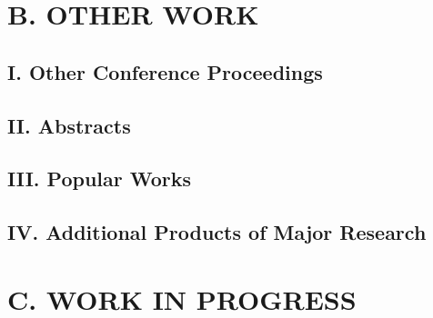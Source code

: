 \documentclass{res}
\newcommand{\MarginText}[1]{\section{#1}\vspace{10pt}}
\begin{document}
\begin{resume}
  \MarginText{B. OTHER WORK}
  \subsection{I. Other Conference Proceedings}
  \nocite{*}
  \vspace{10pt}
  \printbibliography[heading=none]

  \subsection{II. Abstracts}
  \subsection{III. Popular Works}
  \subsection{IV. Additional Products of Major Research}
  \nocite{*}
  \vspace{10pt}
  \printbibliography[heading=none]

  \MarginText{C. WORK IN PROGRESS}
  \clearpage

\end{resume}
\end{document}
